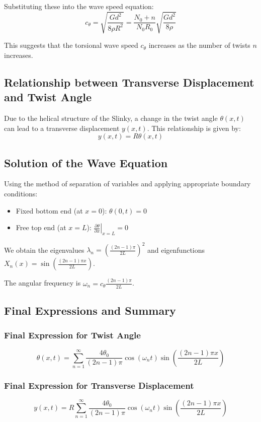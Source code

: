 \documentclass{mcmthesis}  %
\begin{document}
Substituting these into the wave speed equation:
\[ c_{\theta} = \sqrt{\frac{G d^2}{8 \rho R^2}} = \frac{N_0+n}{N_0 R_0} \sqrt{\frac{G d^2}{8 \rho}} \]

This suggests that the torsional wave speed \(c_{\theta}\) increases as the number of twists \(n\) increases.

\subsection{Relationship between Transverse Displacement and Twist Angle}
Due to the helical structure of the Slinky, a change in the twist angle \(\theta(x,t)\) can lead to a transverse displacement \(y(x,t)\). This relationship is given by:
\[ y(x,t) = R \theta(x,t) \]

\subsection{Solution of the Wave Equation}
Using the method of separation of variables and applying appropriate boundary conditions:
\begin{itemize}
    \item Fixed bottom end (at \(x=0\)): \(\theta(0,t) = 0\)
    \item Free top end (at \(x=L\)): \(\left. \frac{\partial \theta}{\partial x} \right|_{x=L} = 0\)
\end{itemize}

We obtain the eigenvalues \(\lambda_n = \left(\frac{(2n-1)\pi}{2L}\right)^2\) and eigenfunctions \(X_n(x) = \sin\left(\frac{(2n-1)\pi x}{2L}\right)\).

The angular frequency is \(\omega_n = c_{\theta} \frac{(2n-1)\pi}{2L}\).

\subsection{Final Expressions and Summary}

\subsubsection{Final Expression for Twist Angle}
\[ \theta(x,t) = \sum_{n=1}^{\infty} \frac{4\theta_0}{(2n-1)\pi} \cos(\omega_n t) \sin\left(\frac{(2n-1)\pi x}{2L}\right) \]

\subsubsection{Final Expression for Transverse Displacement}
\[ y(x,t) = R \sum_{n=1}^{\infty} \frac{4\theta_0}{(2n-1)\pi} \cos(\omega_n t) \sin\left(\frac{(2n-1)\pi x}{2L}\right) \]
\end{document}
